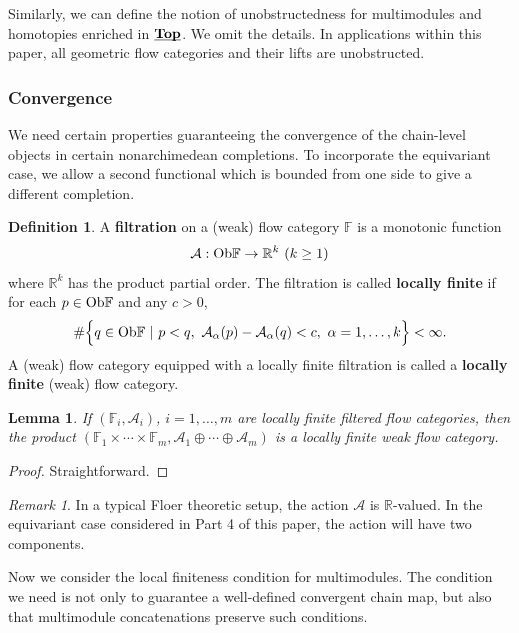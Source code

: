 \documentclass[reqno, 10pt]{amsart}
\numberwithin{equation}{section}
\numberwithin{equation}{section}
\newtheorem{lemma}[thm]{Lemma}
\theoremstyle{definition}
\newtheorem{defn}[thm]{Definition}
\theoremstyle{remark}
\newtheorem{rem}[thm]{Remark}
\newcommand{\beqn}{\begin{equation*}}
\newcommand{\eeqn}{\end{equation*}}
\newcommand{\mb}{\mathbb}
\newcommand{\mc}{\mathcal}
\newcommand{\uds}[1]{\underline{\smash{#1}}}
\begin{document}
Similarly, we can define the notion of unobstructedness for multimodules and homotopies enriched in $\uds{\bf Top}$. We omit the details. In applications within this paper, all geometric flow categories and their lifts are unobstructed. 


\subsubsection{Convergence}

We need certain properties guaranteeing the convergence of the chain-level objects in certain nonarchimedean completions. To incorporate the equivariant case, we allow a second functional which is bounded from one side to give a different completion.


\begin{defn}\label{defn_local_finite_flow}
A {\bf filtration} on a (weak) flow category ${\mb F}$ is a monotonic function
\beqn
{\mc A}: {\rm Ob}{\mb F} \to {\mb R}^k\ (k\geq 1)
\eeqn
where ${\mb R}^k$ has the product partial order. The filtration is called {\bf locally finite} if for each $p \in {\rm Ob}{\mb F}$ and any $c>0$,
    \beqn
\# \Big\{ q \in {\rm Ob}{\mb F}\ |\ p< q,\  {\mc A}_\alpha (p) - {\mc A}_\alpha (q) < c,\ \alpha = 1, \ldots, k \Big\} < \infty.
\eeqn
A (weak) flow category equipped with a locally finite filtration is called a {\bf locally finite} (weak) flow category.
\end{defn}

\begin{lemma}
If $({\mb F}_i, {\mc A}_i)$, $i = 1, \ldots, m$ are locally finite filtered flow categories, then the product $({\mb F}_1 \times \cdots \times {\mb F}_m, {\mc A}_1 \oplus \cdots \oplus {\mc A}_m)$ is a locally finite weak flow category.
\end{lemma}

\begin{proof}
Straightforward.
\end{proof}

\begin{rem}
In a typical Floer theoretic setup, the action ${\mc A}$ is ${\mb R}$-valued. In the equivariant case considered in Part 4 of this paper, the action will have two components. 
\end{rem}

Now we consider the local finiteness condition for multimodules. The condition we need is not only to guarantee a well-defined convergent chain map, but also that multimodule concatenations preserve such conditions. %
\end{document}
